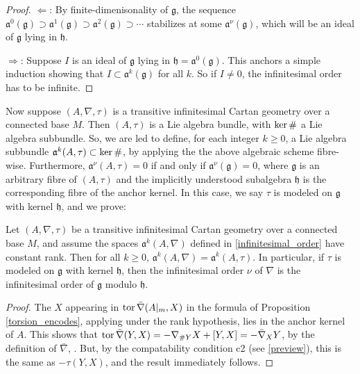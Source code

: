 \documentclass[leqno,12pt]{amsart} %
\begin{document}
\begin{proof}
  $\Leftarrow$: By finite-dimenisonality of ${\mathfrak g} $, the sequence
  ${\mathfrak a}^0({\mathfrak g}) \supset {\mathfrak a}^1({\mathfrak g}) \supset
  {\mathfrak a}^2({\mathfrak g}) \supset \cdots $ stabilizes at some
  ${\mathfrak a}^\nu({\mathfrak g})$, which will be an ideal of ${\mathfrak g} $ lying in
  ${\mathfrak h} $.

  $\Rightarrow$: Suppose $I$ is an ideal of ${\mathfrak g} $ lying in
  ${\mathfrak h} = {\mathfrak a}^0({\mathfrak g})$. This anchors a simple induction
  showing that $I \subset {\mathfrak a}^k({\mathfrak g})$ for all $k$. So if $I\ne 0$, the
  infinitesimal order has to be infinite.
\end{proof}

Now suppose $(A, \nabla, \tau)$ is a transitive infinitesimal Cartan geometry over a
connected base $M$. Then $(A, \tau)$ is a Lie algebra bundle, with $\operatorname{ker}\#$ a Lie
algebra subbundle. So, we are led to define, for each integer $k\ge 0$, a Lie algebra
subbundle ${\mathfrak a}^k(A, \tau)\subset \operatorname{ker}\#$, by applying the the above algebraic
scheme fibre-wise. Furthermore, ${\mathfrak a}^\nu(A, \tau)=0$ if and only if
${\mathfrak a}^\nu({\mathfrak g}) = 0$, where ${\mathfrak g} $ is an arbitrary fibre of
$(A, \tau)$ and the implicitly understood subalgebra ${\mathfrak h}$ is the corresponding
fibre of the anchor kernel. In this case, we say $\tau $ {\df is modeled on
  ${\mathfrak g}$ with kernel ${\mathfrak h}$}, and we prove:

\begin{theorem}
  Let $(A, \nabla, \tau)$ be a transitive infinitesimal Cartan geometry over a connected
  base $M$, and assume the spaces ${\mathfrak a}^k(A, \nabla)$ defined in
  \ref{infinitesimal_order} have constant rank. Then for all $k\ge 0$,
  ${\mathfrak a}^k(A, \nabla)={\mathfrak a}^k(A, \tau)$. In particular, if $\tau $ is
  modeled on ${\mathfrak g}$ with kernel ${\mathfrak h}$, then the infinitesimal order
  $\nu$ of $\nabla $ is the infinitesimal order of ${\mathfrak g} $ modulo
  ${\mathfrak h}$.
\end{theorem}
\noindent%


\begin{proof}
  The $X$ appearing in $\operatorname{tor} \bar\nabla (A|_m, X)$ in the formula of Proposition
  \ref{torsion_encodes}, applying under the rank hypothesis, lies in the anchor kernel of
  $A$. This shows that
  $\operatorname{tor} \bar\nabla (Y, X) = -\nabla_{\#Y}X + [Y, X] = -\bar\nabla_XY$, by the
  definition of $\bar\nabla$, . But, by the compatability condition c2
  (see \ref{preview}), this is the same as $-\tau(Y, X)$, and the result immediately
  follows.
\end{proof}
\end{document}
